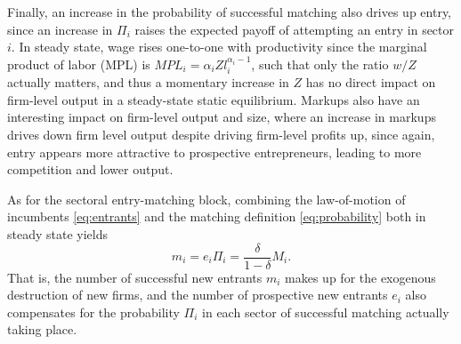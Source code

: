 \documentclass[a4paper,12pt]{article} %
\numberwithin{equation}{section} %
\numberwithin{figure}{section}
\numberwithin{table}{section}
\begin{document}
Finally, an increase in the probability of successful matching also drives up entry, since an increase in $\Pi_i$ raises the expected payoff of attempting
an entry in sector $i$. In steady state, wage rises one-to-one with productivity since the marginal product of labor (MPL) is 
$MPL_i = \alpha_i Z l_i^{\alpha_i -1}$, such that only the ratio $w/Z$ actually matters, and thus a momentary increase in $Z$ has no direct impact
on firm-level output in a steady-state static equilibrium. Markups also have an interesting impact on firm-level output and size, where an increase in markups drives down firm level output
despite driving firm-level profits up, since again, entry appears more attractive to prospective entrepreneurs, leading to more competition and lower
output.



As for the sectoral entry-matching block, combining the law-of-motion of incumbents \eqref{eq:entrants} and the matching 
definition \eqref{eq:probability} both in steady state yields 
\begin{equation}
m_i= e_i\Pi_i= \frac{\delta}{1-\delta}M_i. \label{steadyentrants} 
\end{equation}
That is, the number of successful new entrants $m_i$ makes up for the exogenous destruction of new firms, and the 
number of prospective new entrants $e_i$ also compensates for the probability $\Pi_i$ in each sector of successful
matching actually taking place.
\end{document}

